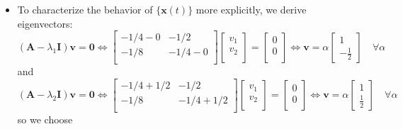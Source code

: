 \documentclass[12pt,a4paper]{article}
\begin{document}
\begin{itemize}
\begin{itemize}
  \item To characterize the behavior of $\{\bm{x}(t)\}$ more explicitly,
    we derive eigenvectors:
    \begin{equation}\nonumber%
      (\bm{A}-\lambda_{1}\bm{I})\bm{v}
      = \bm{0}
      \iff
      \begin{bmatrix}
        -1/4 - 0 & - 1/2 \\
        -1/8 & -1/4 - 0 \\
      \end{bmatrix}
      \begin{bmatrix}
        v_{1} \\
        v_{2} \\
      \end{bmatrix}
      =
      \begin{bmatrix}
        0 \\
        0 \\
      \end{bmatrix}
      \iff
      \bm{v} = \alpha
      \begin{bmatrix}
        1 \\
        -\frac{1}{2}
      \end{bmatrix}
      \quad \forall \alpha
    \end{equation}
    and
    \begin{equation}\nonumber%
      (\bm{A}-\lambda_{2}\bm{I})\bm{v}
      = \bm{0}
      \iff
      \begin{bmatrix}
        -1/4 + 1/2 & - 1/2 \\
        -1/8 & -1/4 + 1/2 \\
      \end{bmatrix}
      \begin{bmatrix}
        v_{1} \\
        v_{2} \\
      \end{bmatrix}
      =
      \begin{bmatrix}
        0 \\
        0 \\
      \end{bmatrix}
      \iff
      \bm{v} = \alpha
      \begin{bmatrix}
        1 \\
        \frac{1}{2}
      \end{bmatrix}
      \quad \forall \alpha
    \end{equation}
    so we choose
    \begin{equation}\nonumber%

\end{equation}
\end{itemize}
\end{itemize}
\end{document}
